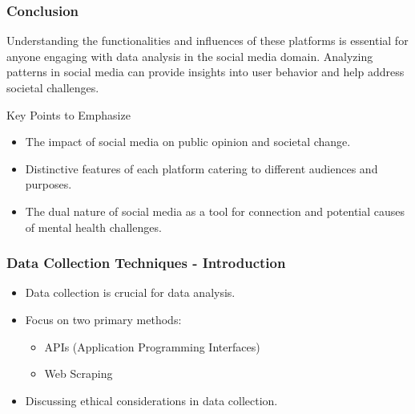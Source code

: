 \documentclass{beamer}
\begin{document}
\begin{frame}[fragile]
    \frametitle{Conclusion}
    Understanding the functionalities and influences of these platforms is essential for anyone engaging with data analysis in the social media domain.
    Analyzing patterns in social media can provide insights into user behavior and help address societal challenges.
    
    \begin{block}{Key Points to Emphasize}
        \begin{itemize}
            \item The impact of social media on public opinion and societal change.
            \item Distinctive features of each platform catering to different audiences and purposes.
            \item The dual nature of social media as a tool for connection and potential causes of mental health challenges.
        \end{itemize}
    \end{block}
\end{frame}

\begin{frame}[fragile]
    \frametitle{Data Collection Techniques - Introduction}
    \begin{itemize}
        \item Data collection is crucial for data analysis.
        \item Focus on two primary methods: 
        \begin{itemize}
            \item APIs (Application Programming Interfaces)
            \item Web Scraping
        \end{itemize}
        \item Discussing ethical considerations in data collection.
    \end{itemize}
\end{frame}
\end{document}
